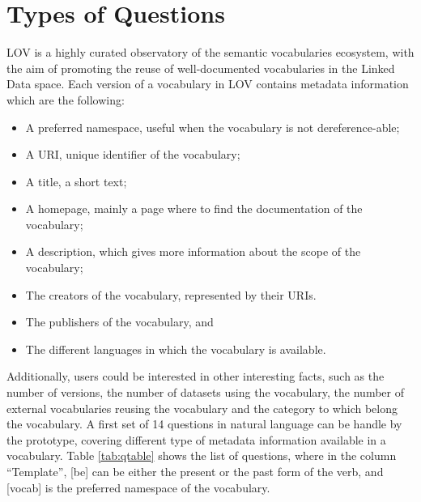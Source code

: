 \documentclass[runningheads,a4paper]{llncs}
\begin{document}
\section{Types of Questions}
\label{sec:questions}

LOV is a highly curated observatory of the semantic vocabularies ecosystem, with the aim of promoting the reuse of well-documented vocabularies in the Linked Data space. Each version of a vocabulary in LOV contains metadata information which are the following:
\begin{itemize}
\item A preferred namespace, useful when the vocabulary is not dereference-able; 
\item A URI, unique identifier of the vocabulary;
\item A title, a short text; 
\item A homepage, mainly a page where to find the documentation of the vocabulary;
\item A description, which gives more information about the scope of the vocabulary;
\item The creators of the vocabulary, represented by their URIs.
\item The publishers of the vocabulary, and
\item The different languages in which the vocabulary is available.
\end{itemize}

Additionally, users could be interested in other interesting facts, such as the number of versions, the number of datasets  using the vocabulary, the number of external vocabularies reusing the vocabulary and the category to which belong the vocabulary. A first set of 14 questions in natural language can be handle by the prototype, covering different type of metadata information available in a vocabulary. Table \ref{tab:qtable} shows the list of questions, where in the column ``Template'', [be] can be either the present or the past form of the verb, and [vocab] is the preferred namespace of the vocabulary.    
\end{document}
